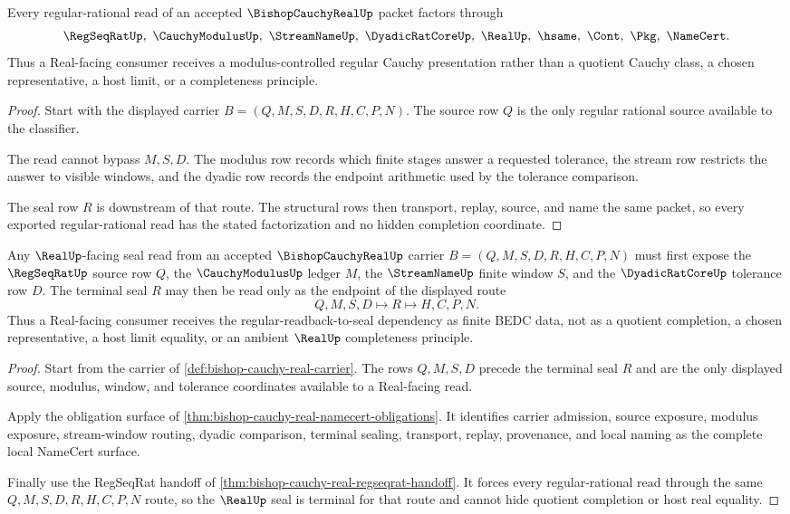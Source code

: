 \begin{theorem}
\label{thm:bishop-cauchy-real-regseqrat-handoff}
Every regular-rational read of an accepted $\BishopCauchyRealUp$ packet factors through
$$
\RegSeqRatUp,\ \CauchyModulusUp,\ \StreamNameUp,\ \DyadicRatCoreUp,\ \RealUp,\ \hsame,\ \Cont,\ \Pkg,\ \NameCert .
$$
Thus a Real-facing consumer receives a modulus-controlled regular Cauchy presentation rather than a quotient Cauchy class, a chosen representative, a host limit, or a completeness principle.
\end{theorem}
\begin{proof}
Start with the displayed carrier $B=(Q,M,S,D,R,H,C,P,N)$. The source row $Q$ is the only regular rational source available to the classifier.

The read cannot bypass $M,S,D$. The modulus row records which finite stages answer a requested tolerance, the stream row restricts the answer to visible windows, and the dyadic row records the endpoint arithmetic used by the tolerance comparison.

The seal row $R$ is downstream of that route. The structural rows then transport, replay, source, and name the same packet, so every exported regular-rational read has the stated factorization and no hidden completion coordinate.
\end{proof}

\begin{theorem}
\label{thm:bishop-cauchy-real-regular-readback-seal}
Any $\RealUp$-facing seal read from an accepted $\BishopCauchyRealUp$ carrier $B=(Q,M,S,D,R,H,C,P,N)$ must first expose the $\RegSeqRatUp$ source row $Q$, the $\CauchyModulusUp$ ledger $M$, the $\StreamNameUp$ finite window $S$, and the $\DyadicRatCoreUp$ tolerance row $D$. The terminal seal $R$ may then be read only as the endpoint of the displayed route
$$
Q,M,S,D \longmapsto R \longmapsto H,C,P,N .
$$
Thus a Real-facing consumer receives the regular-readback-to-seal dependency as finite BEDC data, not as a quotient completion, a chosen representative, a host limit equality, or an ambient $\RealUp$ completeness principle.
\end{theorem}
\begin{proof}
Start from the carrier of \autoref{def:bishop-cauchy-real-carrier}. The rows $Q,M,S,D$ precede the terminal seal $R$ and are the only displayed source, modulus, window, and tolerance coordinates available to a Real-facing read.

Apply the obligation surface of \autoref{thm:bishop-cauchy-real-namecert-obligations}. It identifies carrier admission, source exposure, modulus exposure, stream-window routing, dyadic comparison, terminal sealing, transport, replay, provenance, and local naming as the complete local NameCert surface.

Finally use the RegSeqRat handoff of \autoref{thm:bishop-cauchy-real-regseqrat-handoff}. It forces every regular-rational read through the same $Q,M,S,D,R,H,C,P,N$ route, so the $\RealUp$ seal is terminal for that route and cannot hide quotient completion or host real equality.
\end{proof}

